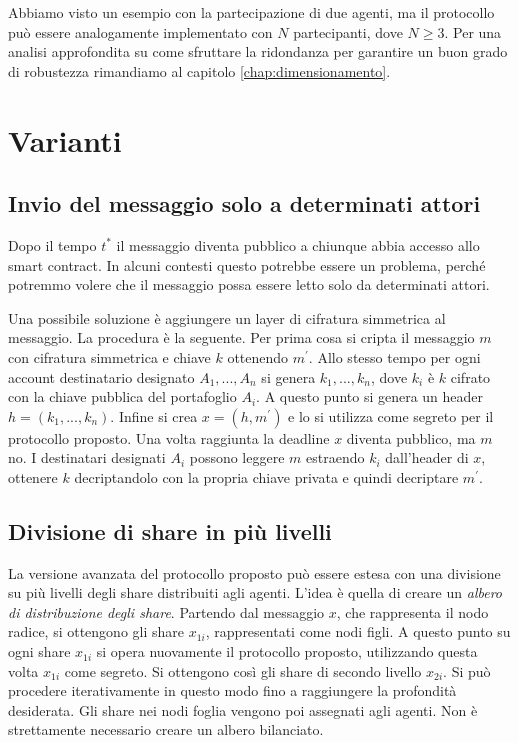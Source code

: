 Abbiamo visto un esempio con la partecipazione di due agenti,
ma il protocollo
può essere analogamente implementato con $ N $ partecipanti, dove $ N \geq 3 $.
Per una analisi approfondita su come sfruttare la ridondanza per
garantire un buon grado di robustezza rimandiamo al capitolo
\ref{chap:dimensionamento}.

\section{Varianti}
\subsection{Invio del messaggio solo a determinati attori}
Dopo il tempo $ t^* $ il messaggio diventa pubblico a chiunque abbia accesso
allo smart contract. In alcuni contesti questo potrebbe essere un problema, perché
potremmo volere che il messaggio possa essere letto solo da determinati attori.

Una possibile soluzione è aggiungere un layer di cifratura simmetrica al messaggio.
La procedura è la seguente.
Per prima cosa si cripta il messaggio $ m $ con cifratura simmetrica e chiave $ k $
ottenendo $ m^\prime $. Allo stesso tempo per ogni account destinatario designato
$ A_1, ..., A_n $ si genera $ k_1, ..., k_n $, dove $ k_i $ è $ k $ cifrato con la
chiave pubblica del portafoglio $ A_i $. A questo punto si genera un header
$ h = (k_1, ..., k_n) $. Infine si crea $ x = (h, m^\prime) $ e lo si utilizza come
segreto per il protocollo proposto.
Una volta raggiunta la deadline $ x $ diventa pubblico, ma $ m $ no. I destinatari designati
$ A_i $ possono leggere $ m $ estraendo $ k_i $ dall'header di $ x $, ottenere
$ k $ decriptandolo con la propria chiave privata e quindi decriptare $ m^\prime $.

\subsection{Divisione di share in più livelli}
La versione avanzata del protocollo proposto può essere estesa con una divisione su più livelli
degli share distribuiti agli agenti.
L'idea è quella di creare un \textit{albero di distribuzione degli share}.
Partendo dal messaggio $ x $, che rappresenta il nodo radice, si ottengono gli share $ x_{1i} $,
rappresentati come nodi figli.
A questo punto su ogni share $ x_{1i} $ si opera nuovamente il protocollo proposto,
utilizzando questa volta $ x_{1i} $ come segreto.
Si ottengono così gli share di secondo livello $ x_{2i} $.
Si può procedere iterativamente in questo modo fino a raggiungere la profondità desiderata.
Gli share nei nodi foglia vengono poi assegnati agli agenti.
Non è strettamente necessario creare un albero bilanciato.

